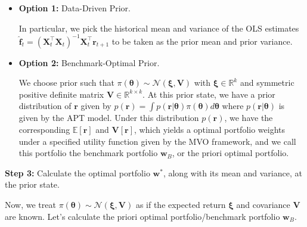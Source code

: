 \documentclass[13pt]{article}
\theoremstyle{definition}
\theoremstyle{remark}
\newcommand{\VV}{\mathbb{\mathbf{V}}}
\begin{document}
\begin{itemize}
    \item \textbf{Option 1:} Data-Driven Prior.

    In particular, we pick the historical mean and variance of the OLS estimates $\hat{\bm{f}}_t=\left(\mathbf{X}_t^{\top} \mathbf{X}_t\right)^{-1} \mathbf{X}_t^{\top} \boldsymbol{r}_{t+1}$ to be taken as the prior mean and prior variance. 

    \item \textbf{Option 2:} Benchmark-Optimal Prior.

    We choose prior such that $\pi(\boldsymbol{\theta}) \sim \mathcal{N}(\boldsymbol{\xi}, \boldsymbol{V})$ with $\boldsymbol{\xi} \in \mathbb{R}^k$ and symmetric positive definite matrix $\boldsymbol{V} \in \mathbb{R}^{k\times k}$. At this prior state, we have a prior distribution of $\bm{r}$ given by $p(\boldsymbol{r})=\int p(\boldsymbol{r} | \boldsymbol{\theta}) \pi(\boldsymbol{\theta}) d \boldsymbol{\theta}$ where $p(\boldsymbol{r} | \boldsymbol{\theta})$ is given by the APT model. Under this distribution $p(\boldsymbol{r})$, we have the corresponding $\mathbb{E}[\boldsymbol{r}]$ and $\VV[\boldsymbol{r}]$, which yields a optimal portfolio weights under a specified utility function given by the MVO framework, and we call this portfolio the benchmark portfolio $\bm{w}_B$, or the priori optimal portfolio.
\end{itemize}

{\color{C6}\textbf{Step 3:} Calculate the optimal portfolio $\bm{w}^*$, along with its mean and variance, at the prior state.}

Now, we treat $\pi(\boldsymbol{\theta}) \sim\mathcal{N}(\boldsymbol{\xi}, \boldsymbol{V})$ as if the expected return $\boldsymbol{\xi}$ and covariance $\boldsymbol{V}$ are known. Let's calculate the priori optimal portfolio/benchmark portfolio $\bm{w}_B$.  
\end{document}
